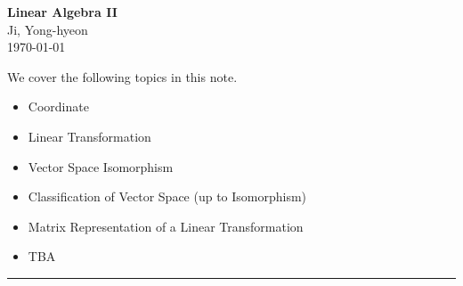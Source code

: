 \documentclass[11pt,openany]{article}
\begin{document}
\begin{center}
	\huge\textbf{Linear Algebra II}\\
	\vspace{0.5em}
	\large{Ji, Yong-hyeon}\\
	\vspace{0.5em}
	\normalsize{\today}\\
\end{center}

\noindent 
We cover the following topics in this note.
\begin{itemize}
	\item Coordinate
	\item Linear Transformation
	\item Vector Space Isomorphism
	\item Classification of Vector Space (up to Isomorphism)
	\item Matrix Representation of a Linear Transformation
	\item TBA
\end{itemize}
\hrule\vspace{12pt}
\vspace{20pt}
\end{document}

